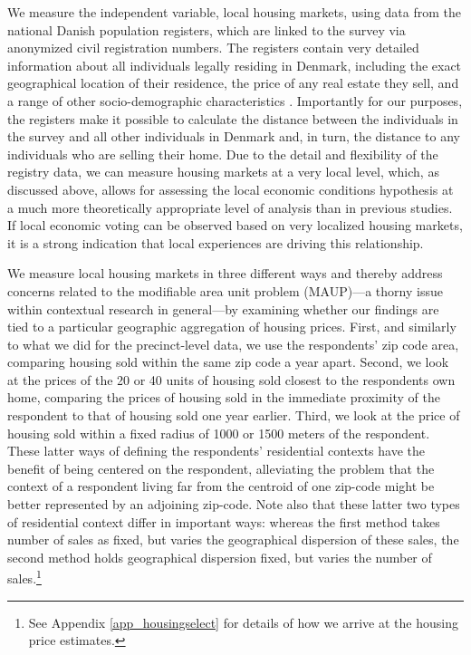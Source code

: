 \documentclass[12pt,a4paper]{article}
\begin{document}
	We measure the independent variable, local housing markets, using data from the national Danish population registers, which are linked to the survey via anonymized civil registration numbers. The registers contain very detailed information about all individuals legally residing in Denmark, including the exact geographical location of their residence, the price of any real estate they sell, and a range of other socio-demographic characteristics \citep{thygesen2011introduction}. Importantly for our purposes, the registers make it possible to calculate the distance between the individuals in the survey and all other individuals in Denmark and, in turn, the distance to any individuals who are selling their home. Due to the detail and flexibility of the registry data, we can measure housing markets at a very local level, which, as discussed above, allows for assessing the local economic conditions hypothesis at a much more theoretically appropriate level of analysis than in previous studies. If local economic voting can be observed based on very localized housing markets, it is a strong indication that local experiences are driving this relationship. 
	
	We measure local housing markets in three different ways and thereby address concerns related to the modifiable area unit problem (MAUP)—a thorny issue within contextual research in general—by examining whether our findings are tied to a particular geographic aggregation of housing prices. First, and similarly to what we did for the precinct-level data, we use the respondents’ zip code area, comparing housing sold within the same zip code a year apart. Second, we look at the prices of the 20 or 40 units of housing sold closest to the respondents own home, comparing the prices of housing sold in the immediate proximity of the respondent to that of housing sold one year earlier. Third, we look at the price of housing sold within a fixed radius of 1000 or 1500 meters of the respondent. These latter ways of defining the respondents’ residential contexts have the benefit of being centered on the respondent, alleviating the problem that the context of a respondent living far from the centroid of one zip-code might be better represented by an adjoining zip-code. Note also that these latter two types of residential context differ in important ways: whereas the first method takes number of sales as fixed, but varies the geographical dispersion of these sales, the second method holds geographical dispersion fixed, but varies the number of sales.\footnote{See Appendix \ref{app_housingselect} for details of how we arrive at the housing price estimates.}
	
\end{document}

